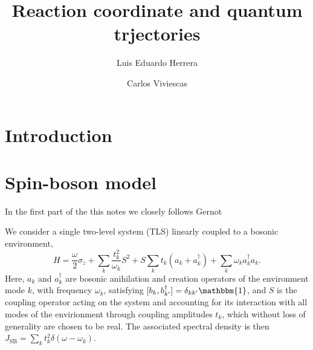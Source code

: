 \documentclass[%
preprint,
onecolumn,
notitlepag,
 amsmath,amssymb,
 aps,
 pra,
]{revtex4-2}
\begin{document}

\title[]{Reaction coordinate and quantum trjectories}

\author{Luis Eduardo Herrera}
\author{Carlos Viviescas}

\begin{abstract}
\end{abstract}
	
\maketitle
%
\section{Introduction}


\section{Spin-boson model}

In the first part of the this notes we closely follows Gernot 

We consider a single two-level system (TLS) linearly coupled to a bosonic environment, 
\begin{equation}
H=\frac{\omega}{2} \sigma_{z}+\sum_{k} \frac{t_{k}^{2}}{\omega_{k}} S^{2}+S \sum_{k} t_{k}\left(a_{k}+a_{k}^{\dagger}\right)+\sum_{k} \omega_{k} a_{k}^{\dagger} a_{k}.
\end{equation}
Here, $a_{k}$ and $a^{\dagger}_{k}$ are bosonic anihilation and creation operators of the environment mode $k$, with frequency $\omega_{k}$, satisfying $[b_{k},b^{\dagger}_{k'}] = \delta_{kk'} \mathbbm{1}$, and $S$ is the coupling operator acting on the system and accounting for its interaction with all modes of the envirionment through coupling amplitudes $t_{k}$, which without loss of generality are chosen to be real. The associated spectral density is then $J_{\text{SB}} = \sum_{k} t_{k}^2 \delta (\omega -  \omega_{k})$.
\end{document}
